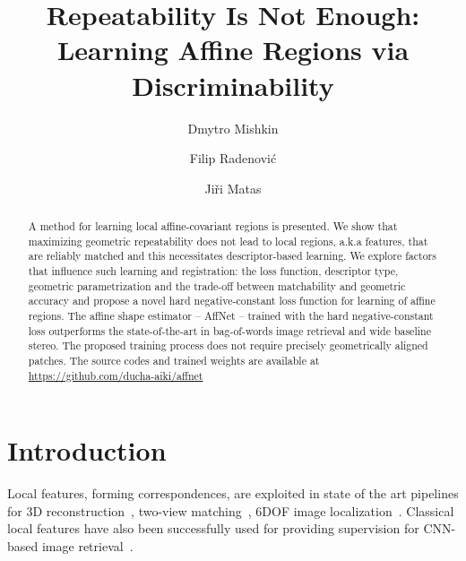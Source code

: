 \documentclass[runningheads]{llncs}
\begin{document}
\title{Repeatability Is Not Enough:\\ Learning Affine Regions via Discriminability} 


\author{Dmytro Mishkin \and
Filip Radenovi\'c \and
Ji\v{r}i Matas
}


\maketitle              

\begin{abstract}
A method for learning local affine-covariant regions is presented.
We show that maximizing geometric repeatability does not lead to local regions, a.k.a features,
that are reliably matched and this necessitates descriptor-based learning.
We explore factors that influence such learning and registration: the loss function, descriptor type, geometric parametrization and the trade-off between matchability and geometric accuracy and propose 
 a novel hard negative-constant loss function for learning of affine regions.
 The affine shape estimator -- AffNet -- trained with the hard negative-constant loss outperforms the state-of-the-art in bag-of-words image retrieval and wide baseline stereo.
 The proposed training process does not require precisely geometrically aligned patches.
 The source codes and trained weights are available at \url{https://github.com/ducha-aiki/affnet}
\end{abstract}
\section{Introduction}
\label{sec:intro}


Local features, forming correspondences, are exploited in state of the art pipelines 
for 3D reconstruction~\cite{Schonberger-CVPR2016sfm,schoenberger2017}, two-view matching~\cite{MODS2015}, 6DOF image localization~\cite{6DOFPlace2017}. Classical local features have also been successfully used for providing supervision for CNN-based image retrieval~\cite{Radenovic-ECCV2016CNNfromBOW}. 
\end{document}
